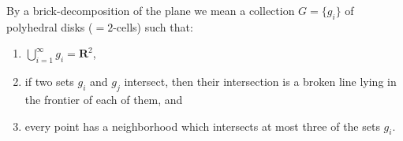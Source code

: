 By a brick-decomposition of the plane we mean a collection $G = \{g_i\}$ of polyhedral disks ($=2$-cells) such that:
\begin{enumerate}
\item $\bigcup_{i=1}^{\infty} g_i = \mathbf{R}^2$,
\item if two sets $g_i$ and $g_j$ intersect, then their intersection is a broken line lying in the frontier of each of them, and
\item every point has a neighborhood which intersects at most three of the sets $g_i$.
\end{enumerate}
